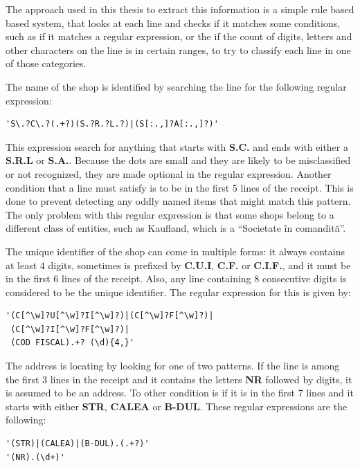 The approach used in this thesis to extract this information is a simple rule based based system, that looks at each line and checks if it matches some conditions, such as if it matches a regular expression, or the if the count of digits, letters and other characters on the line is in certain ranges, to try to classify each line in one of those categories. 

The name of the shop is identified by searching the line for the following regular expression: 

\begin{lstlisting}
'S\.?C\.?(.+?)(S.?R.?L.?)|(S[:.,]?A[:.,]?)'
\end{lstlisting}

This expression search for anything that starts with \textbf{S.C.} and ends with either a \textbf{S.R.L} or \textbf{S.A.}. Because the dots are small and they are likely to be misclassified or not recognized, they are made optional in the regular expression. Another condition that a line must satisfy is to be in the first 5 lines of the receipt. This is done to prevent detecting any oddly named items that might match this pattern. The only problem with this regular expression is that some shops belong to a different class of entities, such as Kaufland, which is a ``Societate în comandită''.

The unique identifier of the shop can come in multiple forms: it always contains at least 4 digits, sometimes is prefixed by \textbf{C.U.I}, \textbf{C.F.} or \textbf{C.I.F.}, and it must be in the first 6 lines of the receipt. Also, any line containing 8 consecutive digits is considered to be the unique identifier. The regular expression for this is given by:

\begin{lstlisting}
'(C[^\w]?U[^\w]?I[^\w]?)|(C[^\w]?F[^\w]?)|
 (C[^\w]?I[^\w]?F[^\w]?)|
 (COD FISCAL).+? (\d){4,}'
\end{lstlisting}

The address is locating by looking for one of two patterns. If the line is among the first 3 lines in the receipt and it contains the letters \textbf{NR} followed by digits, it is assumed to be an address. To other condition is if it is in the first 7 lines and it starts with either \textbf{STR}, \textbf{CALEA} or \textbf{B-DUL}. These regular expressions are the following:

\begin{lstlisting}
'(STR)|(CALEA)|(B-DUL).(.+?)'
'(NR).(\d+)'
\end{lstlisting}


